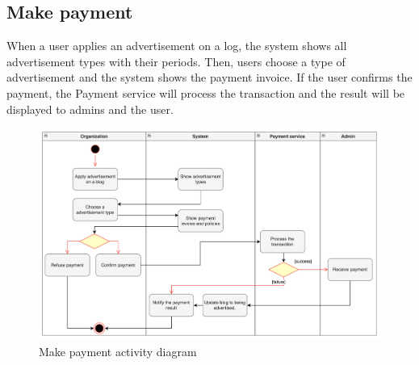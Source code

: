 \subsection{Make payment}
When a user applies an advertisement on a log, the system shows all advertisement types with their periods. Then, users choose a type of advertisement and the system shows the payment invoice. If the user confirms the payment, the Payment service will process the transaction and the result will be displayed to admins and the user.
\begin {figure}[H]
\centering
\includegraphics[width=1\textwidth]{Figures/payment.png}
\caption{Make payment activity diagram}
\label{fig:make-payment}
\end{figure}
\newpage
